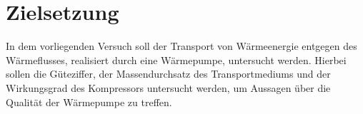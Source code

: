 \section{Zielsetzung}
\label{sec:Zielsetzung}
In dem vorliegenden Versuch soll der Transport von Wärmeenergie entgegen des Wärmeflusses, realisiert durch eine Wärmepumpe, untersucht werden.
Hierbei sollen die Güteziffer, der Massendurchsatz des Transportmediums und der Wirkungsgrad des Kompressors untersucht werden, um Aussagen über die Qualität der Wärmepumpe zu treffen.
